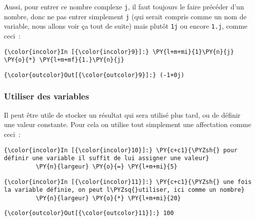     Aussi, pour entrer ce nombre complexe \texttt{j}, il faut toujours le
faire précéder d'un nombre, donc ne pas entrer simplement \texttt{j}
(qui serait compris comme un nom de variable, nous allons voir ça tout
de suite) mais plutôt \texttt{1j} ou encore \texttt{1.j}, comme ceci~:

    \begin{Verbatim}[commandchars=\\\{\},frame=single,framerule=0.3mm,rulecolor=\color{cellframecolor}]
{\color{incolor}In [{\color{incolor}9}]:} \PY{l+m+mi}{1}\PY{n}{j} \PY{o}{*} \PY{l+m+mf}{1.}\PY{n}{j}
\end{Verbatim}


\begin{Verbatim}[commandchars=\\\{\},frame=single,framerule=0.3mm,rulecolor=\color{cellframecolor}]
{\color{outcolor}Out[{\color{outcolor}9}]:} (-1+0j)
\end{Verbatim}
            
    \hypertarget{utiliser-des-variables}{%
\subsubsection{Utiliser des variables}\label{utiliser-des-variables}}

    Il peut être utile de stocker un résultat qui sera utilisé plus tard, ou
de définir une valeur constante. Pour cela on utilise tout simplement
une affectation comme ceci~:

    \begin{Verbatim}[commandchars=\\\{\},frame=single,framerule=0.3mm,rulecolor=\color{cellframecolor}]
{\color{incolor}In [{\color{incolor}10}]:} \PY{c+c1}{\PYZsh{} pour définir une variable il suffit de lui assigner une valeur}
         \PY{n}{largeur} \PY{o}{=} \PY{l+m+mi}{5}
\end{Verbatim}


    \begin{Verbatim}[commandchars=\\\{\},frame=single,framerule=0.3mm,rulecolor=\color{cellframecolor}]
{\color{incolor}In [{\color{incolor}11}]:} \PY{c+c1}{\PYZsh{} une fois la variable définie, on peut l\PYZsq{}utiliser, ici comme un nombre}
         \PY{n}{largeur} \PY{o}{*} \PY{l+m+mi}{20}
\end{Verbatim}


\begin{Verbatim}[commandchars=\\\{\},frame=single,framerule=0.3mm,rulecolor=\color{cellframecolor}]
{\color{outcolor}Out[{\color{outcolor}11}]:} 100
\end{Verbatim}
            
